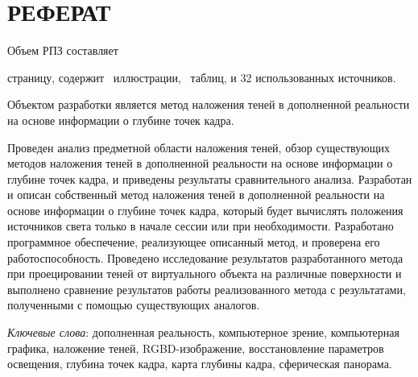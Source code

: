 \chapter*{РЕФЕРАТ}

Объем РПЗ составляет \begin{NoHyper}\pageref{LastPage}\end{NoHyper} страницу, содержит \totfig~иллюстрации, \tottab~таблиц, и 32 использованных источников.

Объектом разработки является метод наложения теней в дополненной реальности на основе информации о глубине точек кадра.

Проведен анализ предметной области наложения теней, обзор существующих методов наложения теней в дополненной реальности на основе информации о глубине точек кадра, и приведены результаты сравнительного анализа. Разработан и описан собственный метод наложения теней в дополненной реальности на основе информации о глубине точек кадра, который будет вычислять положения источников света только в начале сессии или при необходимости. Разработано программное обеспечение, реализующее описанный метод, и проверена его работоспособность. Проведено исследование результатов разработанного метода при проецировании теней от виртуального объекта на различные поверхности и выполнено сравнение результатов работы реализованного метода с результатами, полученными с помощью существующих аналогов.

\textit{Ключевые слова}: дополненная реальность, компьютерное зрение, компьютерная графика, наложение теней, RGBD-изображение, восстановление параметров освещения, глубина точек кадра, карта глубины кадра, сферическая панорама.